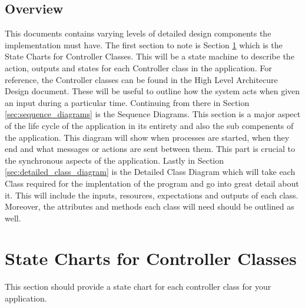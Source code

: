 \documentclass[]{article}
\begin{document}
\subsection{Overview}
\label{sub:overview}

This documents contains varying levels of detailed design components the implementation must have. The first section to note is Section \ref{sec:state_charts_for_controller_classes} which is the State Charts for Controller Classes. This will be a state machine to describe the action, outputs and states for each Controller class in the application. For reference, the Controller classes can be found in the High Level Architecure Design document. These will be useful to outline how the system acts when given an input during a particular time. Continuing from there in Section \ref{sec:sequence_diagrams} is the Sequence Diagrams. This section is a major aspect of the life cycle of the application in its entirety and also the sub compenents of the application. This diagram will show when processes are started, when they end and what messages or actions are sent between them. This part is crucial to the synchronous aspects of the application. Lastly in Section \ref{sec:detailed_class_diagram} is the Detailed Class Diagram which will take each Class required for the implentation of the program and go into great detail about it. This will include the inputs, resources, expectations and outputs of each class. Moreover, the attributes and methods each class will need should be outlined as well.

\section{State Charts for Controller Classes}
\label{sec:state_charts_for_controller_classes}
This section should provide a state chart for each controller class for your application.
\end{document}
